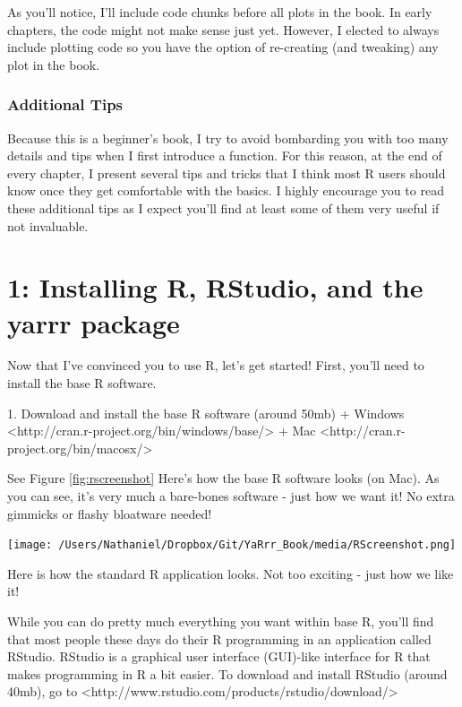 \documentclass{tufte-book}\usepackage[]{graphicx}\usepackage[]{color}
\begin{document}
As you'll notice, I'll include code chunks before all plots in the book. In early chapters, the code might not make sense just yet. However, I elected to always include plotting code so you have the option of re-creating (and tweaking) any plot in the book.

\subsection{Additional Tips}

Because this is a beginner's book, I try to avoid bombarding you with too many details and tips when I first introduce a function. For this reason, at the end of every chapter, I present several tips and tricks that I think most R users should know once they get comfortable with the basics. I highly encourage you to read these additional tips as I expect you'll find at least some of them very useful if not invaluable.


\mainmatter


\chapter{1: Installing R, RStudio, and the yarrr package}
\label{ch:1}


Now that I've convinced you to use R, let's get started! First, you'll need to install the base R software.

1. Download and install the base R software (around 50mb)
    + Windows <http://cran.r-project.org/bin/windows/base/>
    + Mac <http://cran.r-project.org/bin/macosx/>

See Figure \ref{fig:rscreenshot} Here's how the base R software looks (on Mac). As you can see, it's very much a bare-bones software - just how we want it! No extra gimmicks or flashy bloatware needed!

\begin{marginfigure}
\texttt{[image: /Users/Nathaniel/Dropbox/Git/YaRrr\_Book/media/RScreenshot.png]}
\caption{Here is how the standard R application looks. Not too exciting - just how we like it!}
\label{fig:rscreenshot}
\end{marginfigure}

While you can do pretty much everything you want within base R, you'll find that most people these days do their R programming in an application called RStudio. RStudio is a graphical user interface (GUI)-like interface for R that makes programming in R a bit easier. To download and install RStudio (around 40mb), go to <http://www.rstudio.com/products/rstudio/download/>
\end{document}
